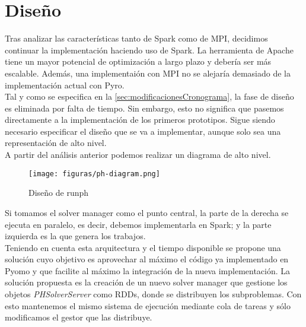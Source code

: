 \chapter{Diseño}
\label{ch:design}

Tras analizar las características tanto de Spark como de MPI, decidimos continuar la implementación haciendo uso de Spark. La herramienta de Apache tiene un mayor potencial de optimización a largo plazo y debería ser más escalable. Además, una implementaión con MPI no se alejaría demasiado de la implementación actual con Pyro.\\

Tal y como se especifica en la \autoref{sec:modificacionesCronograma}, la fase de diseño es eliminada por falta de tiempo. Sin embargo, esto no significa que pasemos directamente a la implementación de los primeros prototipos. Sigue siendo necesario especificar el diseño que se va a implementar, aunque solo sea una representación de alto nivel.\\

A partir del análisis anterior podemos realizar un diagrama de alto nivel.

\begin{figure}[H]
    \centerline{\texttt{[image: figuras/ph-diagram.png]}}
    \caption{Diseño de runph}
    \label{fig:ph-diagram}
\end{figure}

Si tomamos el solver manager como el punto central, la parte de la derecha se ejecuta en paralelo, es decir, debemos implementarla en Spark; y la parte izquierda es la que genera los trabajos.\\

Teniendo en cuenta esta arquitectura y el tiempo disponible se propone una solución cuyo objetivo es aprovechar al máximo el código ya implementado en Pyomo y que facilite al máximo la integración de la nueva implementación. La solución propuesta es la creación de un nuevo solver manager que gestione los objetos \textit{PHSolverServer} como RDDs, donde se distribuyen los subproblemas. Con esto mantenemos el mismo sistema de ejecución mediante cola de tareas y sólo modificamos el gestor que las distribuye. 

